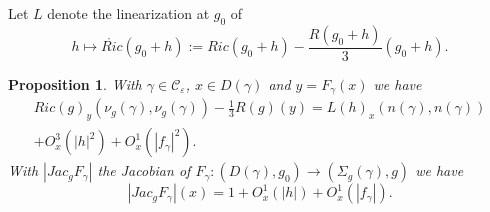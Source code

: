 \documentclass[11pt]{amsart}
\newtheorem{prop}[thm]{Proposition}
\theoremstyle{remark}
\theoremstyle{definition}
\begin{document}
{{	Let $L$ denote the linearization at $g_0$ of 
	$$h\mapsto \mathring{Ric}(g_0+h):=Ric(g_0+h)-\frac{R(g_0+h)}{3}(g_0+h).$$
	
	\begin{prop}\label{asymptotic.expn}
		With $\gamma\in \mathcal C_{\varepsilon}$, $x\in D(\gamma)$ and $y=F_{\gamma}(x)$ we have
		\begin{multline*}Ric(g)_y(\nu_g(\gamma),\nu_g(\gamma))-\frac{1}{3}R(g)(y)=L(h)_x(n(\gamma),n(\gamma))\\ +O^3_x(|h|^2)+O^1_x(|f_{\gamma}|^2).
		\end{multline*}
		With $|Jac_g F_{\gamma}|$ the Jacobian of $F_{\gamma}:(D(\gamma),g_0)\rightarrow (\Sigma_{g}(\gamma),g)$ we have
		$$|Jac_g F_{\gamma}|(x)=1+O_x^1(|h|)+O_x^1(|f_{\gamma}|).$$
	\end{prop}
	
}}
\end{document}
